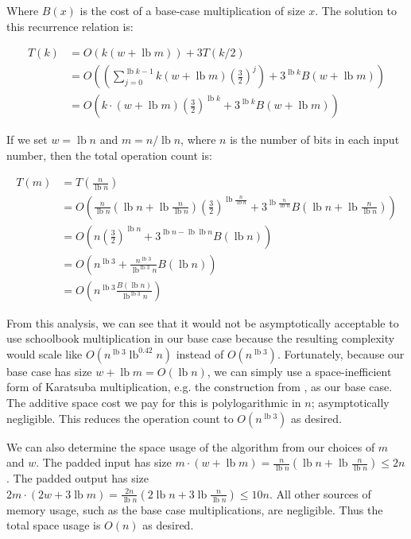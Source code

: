 \documentclass[onecolumn,unpublished]{quantumarticle}
\def\lb{\operatorname{lb}}
\begin{document}
Where $B(x)$ is the cost of a base-case multiplication of size $x$.
The solution to this recurrence relation is:

\begin{equation}
    \begin{aligned}
T(k) &= O(k (w + \lb m)) + 3 T(k/2)
\\   &= O\left(\left(\sum_{j=0}^{\lb k - 1} k (w + \lb m) \left(\frac{3}{2}\right)^j\right) + 3^{\lb k} B(w + \lb m)\right)
\\   &= O\left(k \cdot (w + \lb m) \left(\frac{3}{2}\right)^{\lb k} + 3^{\lb k} B(w + \lb m)\right)
    \end{aligned}
\end{equation}

If we set $w=\lb n$ and $m=n/\lb n$, where $n$ is the number of bits in each input number, then the total operation count is:

\begin{equation}
    \begin{aligned}
T(m) &= T\left(\frac{n}{\lb n}\right)
\\   &= O\left(\frac{n}{\lb n} \left(\lb n + \lb \frac{n}{\lb n}\right) \left(\frac{3}{2}\right)^{\lb \frac{n}{\lb n}} + 3^{\lb \frac{n}{\lb n}} B\left(\lb n + \lb \frac{n}{\lb n}\right)\right)
\\   &= O\left(n \left(\frac{3}{2}\right)^{\lb n} + 3^{\lb n - \lb \lb n} B(\lb n)\right)
\\   &= O\left(n^{\lb 3} + \frac{n^{\lb 3}}{\lb^{\lb 3} n} B(\lb n)\right)
\\   &= O\left(n^{\lb 3} \frac{B(\lb n)}{\lb^{\lb 3} n}\right)
    \end{aligned}
\end{equation}

From this analysis, we can see that it would not be asymptotically acceptable to use schoolbook multiplication in our base case because the resulting complexity would scale like $O(n^{\lb 3} \lb^{0.42} n)$ instead of $O(n^{\lb 3})$.
Fortunately, because our base case has size $w + \lb m = O(\lb n)$, we can simply use a space-inefficient form of Karatsuba multiplication, e.g. the construction from \cite{parent2017karatsuba}, as our base case.
The additive space cost we pay for this is polylogarithmic in $n$; asymptotically negligible.
This reduces the operation count to $O(n^{\lb 3})$ as desired.

We can also determine the space usage of the algorithm from our choices of $m$ and $w$.
The padded input has size $m \cdot (w + \lb m) = \frac{n}{\lb n} (\lb n + \lb \frac{n}{\lb n}) \leq 2 n$.
The padded output has size $2m \cdot (2w + 3 \lb m) = \frac{2n}{\lb n} (2 \lb n + 3 \lb \frac{n}{\lb n}) \leq 10 n$.
All other sources of memory usage, such as the base case multiplications, are negligible.
Thus the total space usage is $O(n)$ as desired.
\end{document}
